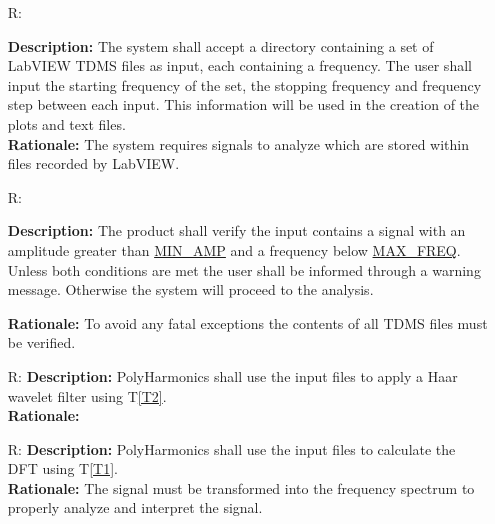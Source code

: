 \documentclass[12pt]{article}
\newcounter{reqnum} %
\newcommand{\progname}{PolyHarmonics}
\begin{document}
\noindent \begin{itemize}

\item[R\refstepcounter{reqnum}\thereqnum \label{R_Input}:] 

\textbf{Description:} The system shall accept a directory containing a set of 
LabVIEW TDMS files as
input, each containing a frequency. The user shall input the starting
 frequency of the set, the stopping frequency and frequency step between each 
 input. This information will be used in the creation of the plots and 
 text files.\\
\textbf{Rationale:} The system requires signals to analyze which are stored
within files recorded by LabVIEW.\\


\item[R\refstepcounter{reqnum}\thereqnum \label{R_Verify}:] 

\textbf{Description:} The product shall verify the input contains a signal
 with an amplitude greater than \hyperref[AppendA]{MIN\_AMP} and a frequency
  below \hyperref[AppendA]{MAX\_FREQ}. Unless both conditions are met 
  the user shall be informed through a warning message. Otherwise the system will 
proceed to the analysis.

\textbf{Rationale:} To avoid any fatal exceptions the contents of all TDMS 
files must be verified.


\item[R\refstepcounter{reqnum}\thereqnum \label{R_Filter}:] 
\textbf{Description:} \progname{} shall use the input files to apply a Haar 
wavelet filter using T\ref{T2}.\\ 
\textbf{Rationale:} 

\item[R\refstepcounter{reqnum}\thereqnum \label{R_Tranform}:] 
\textbf{Description:} \progname{} shall use the input files to calculate the DFT
using T\ref{T1}.\\
\textbf{Rationale:} The signal must be transformed into the frequency spectrum
to properly analyze and interpret the signal.\newline


\end{itemize}
\end{document}
